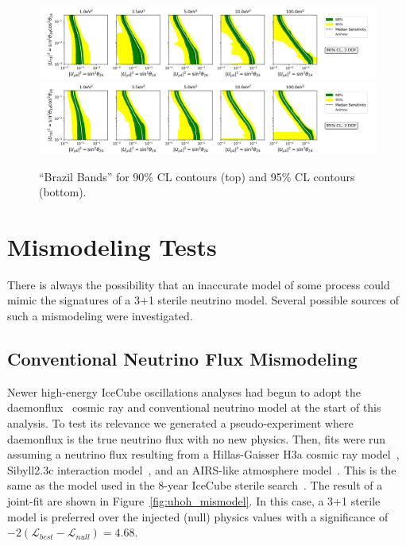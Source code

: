 \documentclass[main.tex]{subfiles}
\begin{document}
\begin{figure}
    \centering
    \includegraphics[width=0.95\linewidth]{figures/median_sense_cl0.9.png}\\
    \includegraphics[width=0.95\linewidth]{figures/median_sense_cl0.95.png}
    \caption{``Brazil Bands'' for 90\% CL contours (top) and 95\% CL contours (bottom).}\label{fig:brazil}
\end{figure}

\section{Mismodeling Tests}

There is always the possibility that an inaccurate model of some process could mimic the signatures of a 3+1 sterile neutrino model. 
Several possible sources of such a mismodeling were investigated. 

\subsection{Conventional Neutrino Flux Mismodeling}\label{fig:flux_mismod}

Newer high-energy IceCube oscillations analyses had begun to adopt the daemonflux~\cite{yanez2023daemonflux} cosmic ray and conventional neutrino model at the start of this analysis. 
To test its relevance we generated a pseudo-experiment where daemonflux is the true neutrino flux with no new physics. 
Then, fits were run assuming a neutrino flux resulting from a Hillas-Gaisser H3a cosmic ray model~\cite{GAISSER2012801}, Sibyll2.3c interaction model~\cite{Riehn:2017mfm}, and an AIRS-like atmosphere model~\cite{airs_ref}. 
This is the same as the model used in the 8-year IceCube sterile search~\cite{Aartsen_2020, Aartsen_2020_prd}. 
The result of a joint-fit are shown in Figure~\ref{fig:uhoh_mismodel}.
In this case, a 3+1 sterile model is preferred over the injected (null) physics values with a significance of $-2(\mathcal{L}_{best}-\mathcal{L}_{null})=4.68$. 
\end{document}
